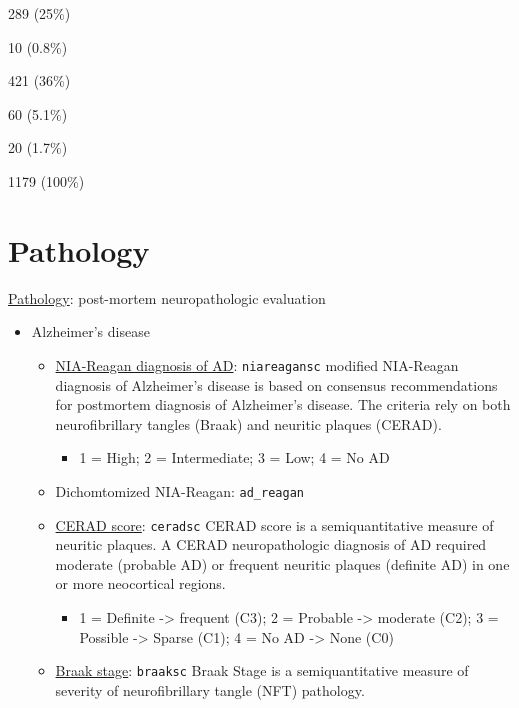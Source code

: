 \documentclass[]{book}
\providecommand{\tightlist}{%
  \setlength{\itemsep}{0pt}\setlength{\parskip}{0pt}}
\begin{document}
289 (25\%)

10 (0.8\%)

421 (36\%)

60 (5.1\%)

20 (1.7\%)

1179 (100\%)

\hypertarget{pathology}{%
\section{Pathology}\label{pathology}}

\href{https://www.radc.rush.edu/docs/var/overview.htm?category=Pathology}{Pathology}: post-mortem neuropathologic evaluation

\begin{itemize}
\tightlist
\item
  Alzheimer's disease

  \begin{itemize}
  \tightlist
  \item
    \href{https://www.radc.rush.edu/docs/var/detail.htm?category=Pathology\&subcategory=Alzheimer\%27s+disease\&variable=niareagansc}{NIA-Reagan diagnosis of AD}: \texttt{niareagansc} modified NIA-Reagan diagnosis of Alzheimer's disease is based on consensus recommendations for postmortem diagnosis of Alzheimer's disease. The criteria rely on both neurofibrillary tangles (Braak) and neuritic plaques (CERAD).

    \begin{itemize}
    \tightlist
    \item
      1 = High; 2 = Intermediate; 3 = Low; 4 = No AD
    \end{itemize}
  \item
    Dichomtomized NIA-Reagan: \texttt{ad\_reagan}
  \item
    \href{https://www.radc.rush.edu/docs/var/detail.htm?category=Pathology\&subcategory=Alzheimer\%27s+disease\&variable=ceradsc}{CERAD score}: \texttt{ceradsc} CERAD score is a semiquantitative measure of neuritic plaques. A CERAD neuropathologic diagnosis of AD required moderate (probable AD) or frequent neuritic plaques (definite AD) in one or more neocortical regions.

    \begin{itemize}
    \tightlist
    \item
      1 = Definite -\textgreater{} frequent (C3); 2 = Probable -\textgreater{} moderate (C2); 3 = Possible -\textgreater{} Sparse (C1); 4 = No AD -\textgreater{} None (C0)
    \end{itemize}
  \item
    \href{https://www.radc.rush.edu/docs/var/detail.htm?category=Pathology\&subcategory=Alzheimer\%27s+disease\&variable=braaksc}{Braak stage}: \texttt{braaksc} Braak Stage is a semiquantitative measure of severity of neurofibrillary tangle (NFT) pathology.


\end{itemize}
\end{itemize}
\end{document}

